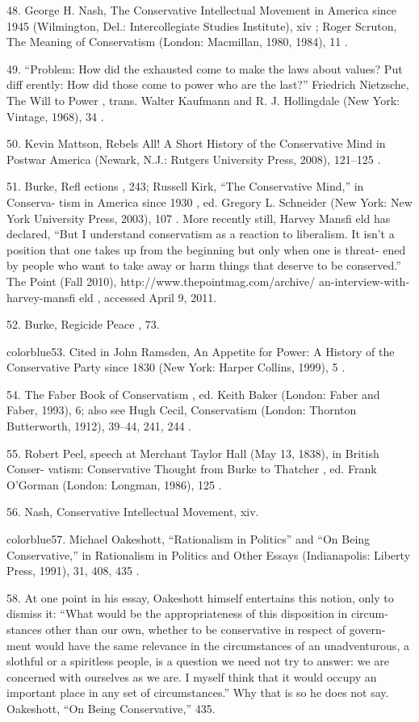 	{\color{blue}48}. George H. Nash, The Conservative Intellectual Movement in America since 1945 (Wilmington, Del.: Intercollegiate Studies Institute), xiv ; Roger Scruton, The Meaning of Conservatism (London: Macmillan, 1980, 1984), 11 .


	{\color{blue}49}. “Problem: How did the exhausted come to make the laws about values? Put diff erently: How did those come to power who are the last?” Friedrich Nietzsche, The Will to Power , trans. Walter Kaufmann and R. J. Hollingdale (New York: Vintage, 1968), 34 .


	{\color{blue}50}. Kevin Mattson, Rebels All! A Short History of the Conservative Mind in Postwar America (Newark, N.J.: Rutgers University Press, 2008), 121–125 .


	{\color{blue}51}. Burke, Refl ections , 243; Russell Kirk, “The Conservative Mind,” in Conserva- tism in America since 1930 , ed. Gregory L. Schneider (New York: New York University Press, 2003), 107 . More recently still, Harvey Mansfi eld has declared, “But I understand conservatism as a reaction to liberalism. It isn’t a position that one takes up from the beginning but only when one is threat- ened by people who want to take away or harm things that deserve to be conserved.” The Point (Fall 2010), http://www.thepointmag.com/archive/ an-interview-with-harvey-mansfi eld , accessed April 9, 2011.


	{\color{blue}52}. Burke, Regicide Peace , 73.


	{color{blue}53}. Cited in John Ramsden, An Appetite for Power: A History of the Conservative Party since 1830 (New York: Harper Collins, 1999), 5 .


	{\color{blue}54}. The Faber Book of Conservatism , ed. Keith Baker (London: Faber and Faber, 1993), 6; also see Hugh Cecil, Conservatism (London: Thornton Butterworth, 1912), 39–44, 241, 244 .


	{\color{blue}55}. Robert Peel, speech at Merchant Taylor Hall (May 13, 1838), in British Conser- vatism: Conservative Thought from Burke to Thatcher , ed. Frank O’Gorman (London: Longman, 1986), 125 .


	{\color{blue}56}. Nash, Conservative Intellectual Movement, xiv.


	{color{blue}57}. Michael Oakeshott, “Rationalism in Politics” and “On Being Conservative,” in Rationalism in Politics and Other Essays (Indianapolis: Liberty Press, 1991), 31, 408, 435 .


	{\color{blue}58}. At one point in his essay, Oakeshott himself entertains this notion, only to dismiss it: “What would be the appropriateness of this disposition in circum- stances other than our own, whether to be conservative in respect of govern- ment would have the same relevance in the circumstances of an unadventurous, a slothful or a spiritless people, is a question we need not try to answer: we are concerned with ourselves as we are. I myself think that it would occupy an important place in any set of circumstances.” Why that is so he does not say. Oakeshott, “On Being Conservative,” 435.


